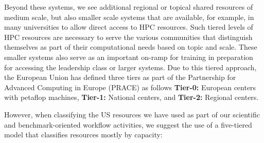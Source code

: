 \documentclass[utf8]{FrontiersinVancouver} %
\begin{document}
Beyond these systems, we see additional regional or topical shared resources of medium scale, but also smaller scale systems that are available, for example, in many universities to allow direct access to HPC resources. Such tiered levels of HPC resources are necessary to serve the various communities that distinguish themselves as part of their computational needs based on topic and scale. These smaller systems also serve as an important on-ramp for training in preparation for accessing the leadership class or larger systems.  Due to this tiered approach, the European Union has defined three tiers as part of the Partnership for Advanced Computing in Europe (PRACE) \cite{www-prace,prace-fact} as follows {\bf Tier-0:} European centers with petaflop machines, {\bf Tier-1:} National centers, and {\bf Tier-2:} Regional centers.
  
However, when classifying the US resources we have used as part of our scientific and benchmark-oriented workflow activities, we suggest the use of a five-tiered model that classifies resources mostly by capacity:
\end{document}
